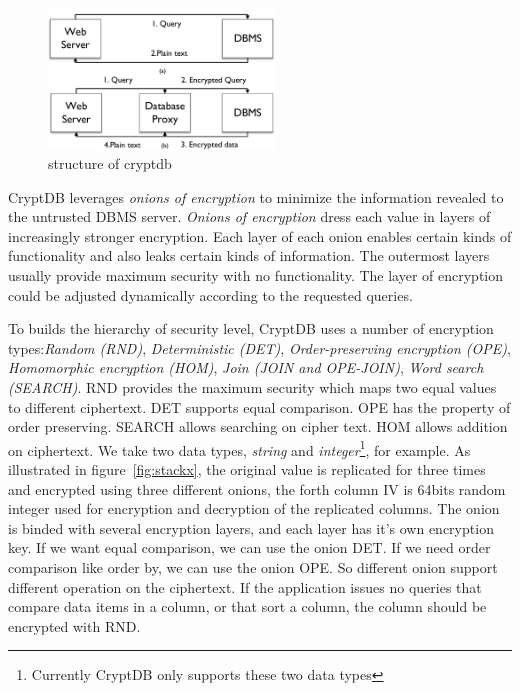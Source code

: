 \begin{figure}[tb]
\centering
\includegraphics[width=6cm]{images/Cryptdb-structure2.pdf}
\caption{structure of cryptdb}
\label{fig:stack1}
\end{figure}



CryptDB leverages \emph{onions of encryption} to minimize the information revealed to the untrusted DBMS server. 
\emph{Onions of encryption} dress each value in layers of increasingly stronger encryption. 
Each layer of each onion enables certain kinds of functionality and also leaks certain kinds of information.
The outermost layers usually provide maximum security with no functionality.
The layer of encryption could be adjusted dynamically according to the requested queries. 

To builds the hierarchy of security level, CryptDB uses a number of encryption types:\textit{Random (RND)}, \textit{Deterministic (DET)}, \textit{Order-preserving encryption (OPE)}, \textit{Homomorphic encryption (HOM)}, \textit{Join (JOIN and OPE-JOIN)}, \textit{Word search (SEARCH)}.
RND provides the maximum security which maps two equal values to different ciphertext. DET supports equal comparison. OPE has the property of order preserving. SEARCH allows searching on cipher text. HOM allows addition on ciphertext. We take two data types, \emph{string} and \emph{integer}\footnote{Currently CryptDB only supports these two data types}, for example. As illustrated in figure~\ref{fig:stackx}, the original value is replicated for three times and encrypted using three different onions, the forth column IV is 64bits random integer used for encryption and decryption of the replicated columns. The onion is binded with several encryption layers, and each layer has it's own encryption key. If we want equal comparison, we can use the onion DET. If we need order comparison like order by, we can use the onion OPE. So different onion support different operation on the ciphertext. If the application issues no queries that compare data items in a column, or that sort a column, the column should be encrypted with RND.


